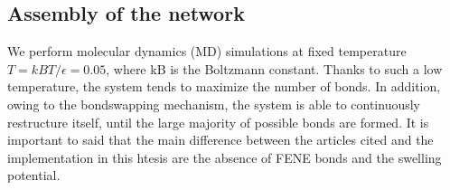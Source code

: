 \documentclass[../main.tex]{subfiles}
\begin{document}



\subsection{Assembly of the network}

We perform molecular dynamics (MD) simulations at fixed temperature $T = kBT/\epsilon = 0.05$, where kB is the Boltzmann constant. 
Thanks to such a low temperature, the system tends to maximize the number of bonds. 
In addition, owing to the bondswapping mechanism, the system is able to continuously restructure itself, until the large majority of possible bonds are formed.
It is important to said that the main difference between the articles cited and the implementation in this htesis are the absence of FENE bonds and the swelling potential.

\end{document}
